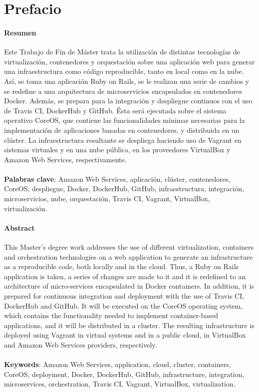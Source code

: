 \chapter*{Prefacio}

\subsubsection{Resumen}
Este Trabajo de Fin de Máster trata la utilización de distintas tecnologías de virtualización, contenedores y orquestación sobre una aplicación web para generar una infraestructura como código reproducible, tanto en local como en la nube. Así, se toma una aplicación Ruby on Rails, se le realizan una serie de cambios y se redefine a una arquitectura de microservicios encapsulados en contenedores Docker. Además, se prepara para la integración y despliegue continuos con el uso de Travis CI, DockerHub y GitHub. Ésta será ejecutada sobre el sistema operativo CoreOS, que contiene las funcionalidades mínimas necesarias para la implementación de aplicaciones basadas en contenedores, y distribuida en un clúster. La infraestructura resultante se despliega haciendo uso de Vagrant en sistemas virtuales y en una nube pública, en los proveedores VirtualBox y Amazon Web Services, respectivamente. 
\\
\\
\textbf{Palabras clave}: Amazon Web Services, aplicación, clúster, contenedores, CoreOS, despliegue, Docker, DockerHub, GitHub, infraestructura, integración, microservicios, nube, orquestación, Travis CI, Vagrant, VirtualBox, virtualización.

\subsubsection{Abstract}
This Master's degree work addresses the use of different virtualization, containers and orchestration technologies on a web application to generate an infrastructure as a reproducible code, both locally and in the cloud. Thus, a Ruby on Rails application is taken, a series of changes are made to it and it is redefined to an architecture of micro-services encapsulated in Docker containers. In addition, it is prepared for continuous integration and deployment with the use of Travis CI, DockerHub and GitHub. It will be executed on the CoreOS operating system, which contains the functionality needed to implement container-based applications, and it will be distributed in a cluster. The resulting infrastructure is deployed using Vagrant in virtual systems and in a public cloud, in VirtualBox and Amazon Web Services providers, respectively.
\\
\\
\textbf{Keywords}: Amazon Web Services, application, cloud, cluster, containers, CoreOS, deployment, Docker, DockerHub, GitHub, infrastructure, integration, microservices, orchestration, Travis CI, Vagrant, VirtualBox, virtualization.
